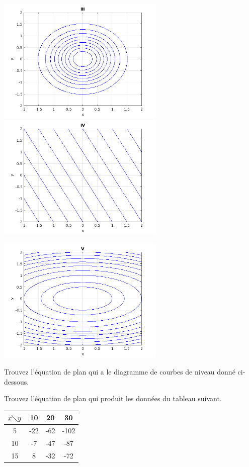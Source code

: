 \begin{question}
\includegraphics[width=8cm]{14_var_mult_fonct/question1c} \ 
\includegraphics[width=8cm]{14_var_mult_fonct/question1d}

\includegraphics[width=8cm]{14_var_mult_fonct/question1e}
\label{14Q3}
\end{question}

\begin{question}
Trouvez l'équation de plan qui a le diagramme de courbes de niveau
donné ci-dessous.
\label{14Q4}
\end{question}

\begin{question}
Trouvez l'équation de plan qui produit les données du tableau
suivant.
\begin{center}
\begin{tabular}{|c|c|c|c|}
\hline
$x \diagdown y$ & 10 & 20 & 30 \\
\hline
5 & -22 & -62 & -102 \\
\hline
10 & -7 & -47 & -87 \\
\hline
15 & 8 & -32 & -72 \\
\hline
\end{tabular}
\end{center}
\label{14Q5}
\end{question}


